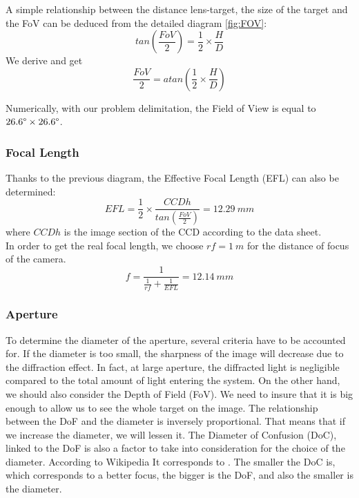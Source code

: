 A simple relationship between the distance lens-target, the size of the target and the FoV can be deduced from the detailed diagram \ref{fig:FOV}: 
\begin{equation*}
tan( \frac{FoV}{2}) = \frac{1}{2} \times \frac{H}{D}
\end{equation*}
We derive and get
\begin{equation*}
 \frac{FoV}{2} = atan(\frac{1}{2} \times \frac{H}{D})
\end{equation*}

Numerically, with our problem delimitation, the Field of View is equal to $26.6\degree \times 26.6\degree$. 

\subsubsection{Focal Length}
\label{focalLength}
Thanks to the previous diagram, the Effective Focal Length (EFL) can also be determined: 
\begin{equation*}
EFL = \frac{1}{2} \times \frac{CCDh}{tan(\frac{FoV}{2})} = 12.29 \ mm
\end{equation*}
where $CCDh$ is the image section of the CCD according to the data sheet.\\

In order to get the real focal length, we choose $rf = 1 \ m$ for the distance of focus of the camera. 
\begin{equation*}
f = \frac{1}{\frac{1}{rf}+\frac{1}{EFL}} = 12.14 \ mm
\end{equation*}

\subsubsection{Aperture}
\label{aperture}
To determine the diameter of the aperture, several criteria have to be accounted for. If the diameter is too small, the sharpness of the image will decrease due to the diffraction effect. In fact, at large aperture, the diffracted light is negligible compared to the total amount of light entering the system. On the other hand, we should also consider the Depth of Field (FoV). We need to insure that it is big enough to allow us to see the whole target on the image. The relationship between the DoF and the diameter is inversely proportional. That means that if we increase the diameter, we will lessen it. The Diameter of Confusion (DoC), linked to the DoF is also a factor to take into consideration for the choice of the diameter. According to Wikipedia \cite{wiki:coc} It corresponds to . The smaller the DoC is, which corresponds to a better focus, the bigger is the DoF, and also the smaller is the diameter.

